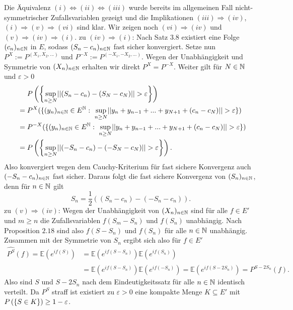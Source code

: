\begin{proof*}
    Die Äquivalenz $(i) \iff (ii) \iff (iii)$ wurde bereits im allgemeinen Fall nicht-symmetrischer Zufallsvariablen gezeigt und die Implikationen $(iii) \Rightarrow (iv)$, $(i) \Rightarrow (v) \Rightarrow (vi)$ sind klar. 
    Wir zeigen noch $(vi) \Rightarrow (iv)$ und $(v) \Rightarrow (iv) \Rightarrow (i)$. 
    \newline
    zu $(iv) \Rightarrow (i)$:
    Nach Satz $3.8$ existiert eine Folge $(c_n)_{n \in \mathbb{N}}$ in $E$, sodass $(S_n - c_n)_{n \in \mathbb{N}}$ fast sicher konvergiert. Setze nun $P^X := P^{(X_1,X_2,...)}$ und $P^{-X} :=P^{(-X_1,-X_2,...)}$. 
    Wegen der Unabhängigkeit und Symmetrie von $(X_n)_{n \in \mathbb{N}}$ erhalten wir direkt $P^X = P^{-X}$. Weiter gilt für $N \in \mathbb{N}$ und $\varepsilon >0$
    \begin{align*}
        &\quad \ P\left(\left\{ \sup_{n \geq N}\lvert\lvert (S_n - c_n) - (S_N- c_N) \rvert\rvert > \varepsilon \right\}\right) \\\
                &= P^X(\{(y_n)_{n \in \mathbb{N}}\in E^{\mathbb{N}}: \  \sup_{n \geq N}\lvert\lvert y_n + y_{n-1} + ... + y_{N+1} + (c_n - c_N) \rvert\rvert > \varepsilon \}) \\\
                &= P^{-X}(\{(y_n)_{n \in \mathbb{N}}\in E^{\mathbb{N}}: \ \sup_{n \geq N}\lvert\lvert y_n + y_{n-1} + ... + y_{N+1} + (c_n - c_N) \rvert\rvert > \varepsilon \}) \\\
                &= P\left(\left\{ \sup_{n \geq N}\lvert\lvert (-S_n - c_n) - (-S_N - c_N) \rvert\rvert > \varepsilon \right\}\right).
    \end{align*}
    Also konvergiert wegen dem Cauchy-Kriterium für fast sichere Konvergenz auch $(-S_n - c_n)_{n \in \mathbb{N}}$ fast sicher. Daraus folgt die fast sichere Konvergenz von $(S_n)_{n \in \mathbb{N}}$, denn für $n \in \mathbb{N}$ gilt
    $$
       S_n =  \frac{1}{2}((S_n - c_n) - (-S_n -c_n)). 
    $$
    zu $(v) \Rightarrow (iv)$: Wegen der Unabhängigkeit von $(X_n)_{n \in \mathbb{N}}$ sind für alle $f \in E'$ und $m \geq n$ die Zufallsvariablen $f(S_m - S_n)$ und $f(S_n)$ unabhängig. 
    Nach Proposition $2.18$ sind also $f(S-S_n)$ und $f(S_n)$ für alle $n \in \mathbb{N}$ unabhängig. Zusammen mit der Symmetrie von $S_n$ ergibt sich also für $f \in E'$
    \begin{align*}
        \widehat{P^S}(f) = \mathbb{E}(e^{if(S)}) &= \mathbb{E}(e^{if(S-S_n)})\mathbb{E}(e^{if(S_n)})  \\\
                                        &= \mathbb{E}(e^{if(S-S_n)})\mathbb{E}(e^{if(-S_n)}) = \mathbb{E}(e^{if(S-2S_n)}) = \widehat{P^{S-2S_n}}(f).
    \end{align*}
    Also sind $S$ und $S - 2S_n$ nach dem Eindeutigkeitssatz für alle $n \in \mathbb{N}$  identisch verteilt. Da $P^S$ straff ist existiert zu $\varepsilon >0$ eine kompakte Menge $K \subseteq E'$ mit $P\left(\left\{ S \in K \right\}\right) \geq 1 - \varepsilon$. 

\end{proof*}
